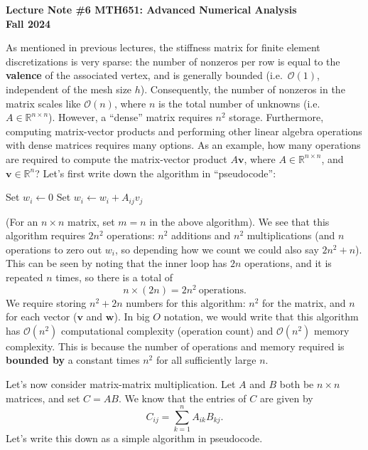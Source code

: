 \documentclass[12pt]{article}
\newcommand{\lectitle}[1]{
   \begin{center}
      \large\bf
      Lecture Note \##1 \hfill
      MTH651: Advanced Numerical Analysis\\
      \rm
      Fall 2024
   \end{center}
}
\begin{document}
\lectitle{6}

As mentioned in previous lectures, the stiffness matrix for finite element discretizations is very sparse: the number of nonzeros per row is equal to the \textbf{valence} of the associated vertex, and is generally bounded (i.e.\ $\mathcal{O}(1)$, independent of the mesh size $h$).
Consequently, the number of nonzeros in the matrix scales like $\mathcal{O}(n)$, where $n$ is the total number of unknowns (i.e.\ $A \in \mathbb{R}^{n \times n}$).
However, a ``dense'' matrix requires $n^2$ storage.
Furthermore, computing matrix-vector products and performing other linear algebra operations with dense matrices requires many options.
As an example, how many operations are required to compute the matrix-vector product $A \bm v$, where $A \in \mathbb{R}^{n \times n}$, and $\bm v \in \mathbb{R}^n$?
Let's first write down the algorithm in ``pseudocode'':

\begin{algorithm}[H]
   \caption{Dense matrix-vector product ($m \times n$ matrix)}
   \begin{algorithmic}[1]
         \State Set $w_i \gets 0$
            \State Set $w_i \gets w_i + A_{ij} v_j$
         \EndFor
      \EndFor
   \end{algorithmic}
\end{algorithm}

(For an $n \times n$ matrix, set $m = n$ in the above algorithm).
We see that this algorithm requires $2 n^2$ operations: $n^2$ additions and $n^2$ multiplications (and $n$ operations to zero out $w_i$, so depending how we count we could also say $2n^2 + n$).
This can be seen by noting that the inner loop has $2 n$ operations, and it is repeated $n$ times, so there is a total of
\[
   n \times (2n) = 2n^2 \ \text{operations.}
\]
We require storing $n^2 + 2n$ numbers for this algorithm: $n^2$ for the matrix, and $n$ for each vector ($\bm v$ and $\bm w$).
In big $O$ notation, we would write that this algorithm has $\mathcal{O}(n^2)$ computational complexity (operation count) and $\mathcal{O}(n^2)$ memory complexity.
This is because the number of operations and memory required is \textbf{bounded by} a constant times $n^2$ for all sufficiently large $n$.


Let's now consider matrix-matrix multiplication.
Let $A$ and $B$ both be $n \times n$ matrices, and set $C = A B$.
We know that the entries of $C$ are given by
\[
   C_{ij} = \sum_{k=1}^n A_{ik} B_{kj}.
\]
Let's write this down as a simple algorithm in pseudocode.
\end{document}
